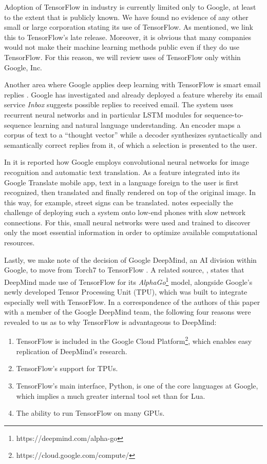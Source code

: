 Adoption of TensorFlow in industry is currently limited only to Google, at least
to the extent that is publicly known. We have found no evidence of any other
small or large corporation stating its use of TensorFlow. As mentioned, we link
this to TensorFlow's late release. Moreover, it is obvious that many companies
would not make their machine learning methods public even if they do use
TensorFlow. For this reason, we will review uses of TensorFlow only within
Google, Inc.

Another area where Google applies deep learning with TensorFlow is smart email
replies \cite{emails}. Google has investigated and already deployed a feature
whereby its email service \emph{Inbox} suggests possible replies to received
email. The system uses recurrent neural networks and in particular LSTM modules
for sequence-to-sequence learning and natural language understanding. An encoder
maps a corpus of text to a ``thought vector'' while a decoder synthesizes
syntactically and semantically correct replies from it, of which a selection is
presented to the user.

In \cite{phones} it is reported how Google employs convolutional neural networks
for image recognition and automatic text translation. As a feature integrated
into its Google Translate mobile app, text in a language foreign to the user is
first recognized, then translated and finally rendered on top of the original
image. In this way, for example, street signs can be translated. \cite{phones}
notes especially the challenge of deploying such a system onto low-end phones
with slow network connections. For this, small neural networks were used and
trained to discover only the most essential information in order to optimize
available computational resources.

Lastly, we make note of the decision of Google DeepMind, an AI division within
Google, to move from Torch7 to TensorFlow \cite{deepmind}. A related source,
\cite{tpu}, states that DeepMind made use of TensorFlow for its
\emph{AlphaGo}\footnote{https://deepmind.com/alpha-go} model, alongside Google's
newly developed Tensor Processing Unit (TPU), which was built to integrate
especially well with TensorFlow. In a correspondence of the authors of this
paper with a member of the Google DeepMind team, the following four reasons were
revealed to us as to why TensorFlow is advantageous to DeepMind:

\begin{enumerate}
\item TensorFlow is included in the Google Cloud
  Platform\footnote{https://cloud.google.com/compute/}, which enables easy
  replication of DeepMind's research.
\item TensorFlow's support for TPUs.
\item TensorFlow's main interface, Python, is one of the core languages at
  Google, which implies a much greater internal tool set than for Lua.
\item The ability to run TensorFlow on many GPUs.
\end{enumerate}

